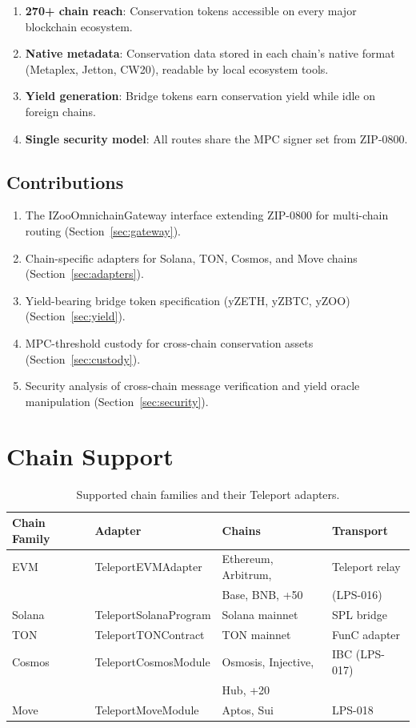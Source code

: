 \documentclass[11pt,letterpaper]{article}
\begin{document}
\begin{enumerate}
    \item \textbf{270+ chain reach}: Conservation tokens accessible on every major blockchain ecosystem.
    \item \textbf{Native metadata}: Conservation data stored in each chain's native format (Metaplex, Jetton, CW20), readable by local ecosystem tools.
    \item \textbf{Yield generation}: Bridge tokens earn conservation yield while idle on foreign chains.
    \item \textbf{Single security model}: All routes share the MPC signer set from ZIP-0800.
\end{enumerate}

\subsection{Contributions}

\begin{enumerate}
    \item The IZooOmnichainGateway interface extending ZIP-0800 for multi-chain routing (Section~\ref{sec:gateway}).
    \item Chain-specific adapters for Solana, TON, Cosmos, and Move chains (Section~\ref{sec:adapters}).
    \item Yield-bearing bridge token specification (yZETH, yZBTC, yZOO) (Section~\ref{sec:yield}).
    \item MPC-threshold custody for cross-chain conservation assets (Section~\ref{sec:custody}).
    \item Security analysis of cross-chain message verification and yield oracle manipulation (Section~\ref{sec:security}).
\end{enumerate}

\section{Chain Support}

\begin{table}[t]
\centering
\begin{tabular}{llll}
\toprule
\textbf{Chain Family} & \textbf{Adapter} & \textbf{Chains} & \textbf{Transport} \\
\midrule
EVM & TeleportEVMAdapter & Ethereum, Arbitrum, & Teleport relay \\
 & & Base, BNB, +50 & (LPS-016) \\
Solana & TeleportSolanaProgram & Solana mainnet & SPL bridge \\
TON & TeleportTONContract & TON mainnet & FunC adapter \\
Cosmos & TeleportCosmosModule & Osmosis, Injective, & IBC (LPS-017) \\
 & & Hub, +20 & \\
Move & TeleportMoveModule & Aptos, Sui & LPS-018 \\
\bottomrule
\end{tabular}
\caption{Supported chain families and their Teleport adapters.}
\label{tab:chains}
\end{table}
\end{document}

